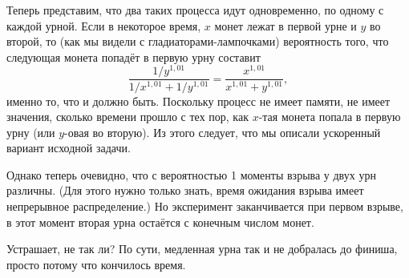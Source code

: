 Теперь представим, что два таких процесса идут одновременно, по одному с каждой урной.
Если в некоторое время, $x$ монет лежат в первой урне и $y$ во второй, то (как мы видели с гладиаторами-лампочками) %
вероятность того, что следующая монета попадёт в первую урну составит
\[\frac{1/y^{1{,}01}}{1/x^{1{,}01}+1/y^{1{,}01}}=\frac{x^{1{,}01}}{x^{1{,}01}+y^{1{,}01}},\]
именно то, что и должно быть.
Поскольку процесс не имеет памяти,
не имеет значения, сколько времени прошло с тех пор, как $x$-тая монета попала в первую урну (или $y$-овая во вторую).
Из этого следует, что мы описали ускоренный вариант исходной задачи.

Однако теперь очевидно, что с вероятностью 1 моменты взрыва у двух урн различны.
(Для этого нужно только знать, время ожидания взрыва имеет непрерывное распределение.)
Но эксперимент заканчивается при первом взрыве, в этот момент вторая урна остаётся с конечным числом монет.\heart

Устрашает, не так ли?
По сути, медленная урна так и не добралась до финиша, просто потому что кончилось время.
